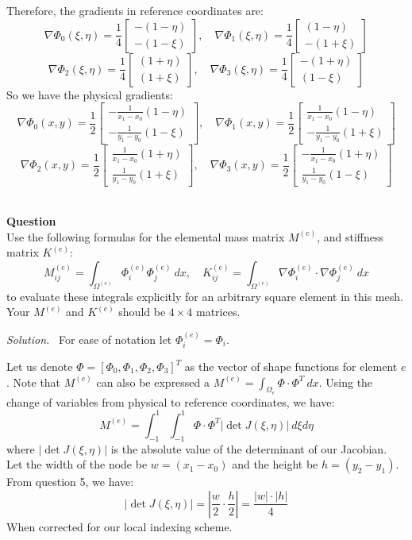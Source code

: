 \documentclass[12pt]{article}
\newcounter{question}
\newcounter{subquest}
\newcommand{\question}{
    \stepcounter{question} 
    \newpage
    \vspace{1.5em}
    \textbf{\\ \Large Question \thequestion \ }
    \vspace{.5em} 
    \setcounter{subquest}{0}\ \\}
\newcommand{\solution}
    {\par\vspace{0.5em}\noindent\emph{Solution.}\ }
    {\par\vspace{1em}}
\begin{document}
Therefore, the gradients in reference coordinates are:
\[\nabla \Phi_0(\xi,\eta) = \frac{1}{4}\begin{bmatrix}
-(1-\eta) \\ -(1-\xi)
\end{bmatrix}, \quad \nabla \Phi_1(\xi,\eta) = \frac{1}{4}\begin{bmatrix}
(1-\eta) \\ -(1+\xi)
\end{bmatrix}\] 
\[\nabla \Phi_2(\xi,\eta) = \frac{1}{4}\begin{bmatrix}
(1+\eta) \\ (1+\xi)
\end{bmatrix}, \quad \nabla \Phi_3(\xi,\eta) = \frac{1}{4}\begin{bmatrix}
-(1+\eta) \\ (1-\xi)
\end{bmatrix}\]
So we have the physical gradients:
\[\nabla  \Phi_0(x,y) = \frac{1}{2}\begin{bmatrix}
-\frac{1}{x_1 - x_0}(1-\eta) \\ -\frac{1}{y_1-y_0}(1-\xi)
\end{bmatrix}, \quad \nabla  \Phi_1(x,y) = \frac{1}{2}\begin{bmatrix}
\frac{1}{x_1-x_0}(1-\eta) \\ -\frac{1}{y_1-y_0}(1+\xi)
\end{bmatrix}\] 
\[\nabla  \Phi_2(x,y) = \frac{1}{2}\begin{bmatrix}
\frac{1}{x_1-x_0}(1+\eta) \\ \frac{1}{y_1-y_0}(1+\xi)
\end{bmatrix}, \quad \nabla  \Phi_3(x,y) = \frac{1}{2}\begin{bmatrix}
-\frac{1}{x_1-x_0}(1+\eta) \\ \frac{1}{y_1-y_0}(1-\xi)
\end{bmatrix}\]


\question
Use the following formulas for the elemental mass matrix $M^{(e)}$, and stiffness matrix $K^{(e)}$:
\[M_{ij}^{(e)} = \int_{\Omega^{(e)}} \Phi_i^{(e)} \Phi_j^{(e)} \ dx, \quad K_{ij}^{(e)} = \int_{\Omega^{(e)}} \nabla \Phi_i^{(e)} \cdot \nabla \Phi_j^{(e)} \ dx\]
to evaluate these integrals explicitly for an arbitrary square element in this mesh. Your $M^{(e)}$ and $K^{(e)}$ should be $4 \times 4$ matrices.

\solution
For ease of notation let $\Phi_i^{(e)} = \Phi_i$.

Let us denote $\Phi = [\Phi_0, \Phi_1, \Phi_2, \Phi_3]^T$ as the vector of shape functions for element $e$. Note that $M^{(e)}$ can also be expressed a $M^{(e)} = \int_{\Omega_e} \Phi \cdot \Phi^T \ dx$. Using the change of variables from physical to reference coordinates, we have:
\[M^{(e)} = \int_{-1}^{1} \int_{-1}^{1} \Phi \cdot \Phi^T |\det{J(\xi,\eta)}| \ d\xi d\eta\]
where $|\det{J(\xi,\eta)}|$ is the absolute value of the determinant of our Jacobian. Let the width of the node be $w = (x_1 - x_0)$ and the height be $h = (y_2 - y_1)$. From question 5, we have:
\[|\det{J(\xi,\eta)}| = \left| \frac{w}{2} \cdot \frac{h}{2}\right| = \frac{|w| \cdot |h|}{4}\]
When corrected for our local indexing scheme.
\end{document}
